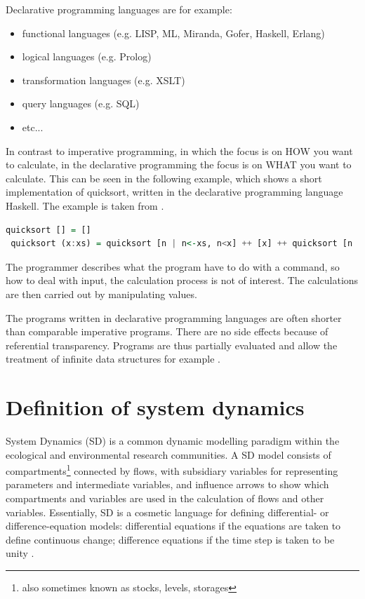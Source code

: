\par
Declarative programming languages are for example:
\begin{itemize}
	\item functional languages (e.g. LISP, ML, Miranda, Gofer, Haskell, Erlang)
	\item logical languages (e.g. Prolog)
	\item transformation languages (e.g. XSLT)
	\item query languages (e.g. SQL)
	\item etc...
\end{itemize}

\par
In contrast to imperative programming, in which the focus is on HOW you want to calculate, in the declarative programming the focus is on WHAT you want to calculate. This can be seen in the following example, which shows a short implementation of quicksort, written in the declarative programming language Haskell. The example is taken from \autocite{appendix:declarative_programming}.
\begin{lstlisting}[language=Haskell]
 quicksort [] = []
 quicksort (x:xs) = quicksort [n | n<-xs, n<x] ++ [x] ++ quicksort [n | n<-xs, n>=x]
\end{lstlisting}
The programmer describes what the program have to do with a command, so how to deal with input, the calculation process is not of interest. The calculations are then carried out by manipulating values.
\par
The programs written in declarative programming languages are often shorter than comparable imperative programs. There are no side effects because of referential transparency. Programs are thus partially evaluated and allow the treatment of infinite data structures for example \autocite{appendix:hawkins}.

\section{Definition of system dynamics}
\par
System Dynamics (SD) is a common dynamic modelling paradigm within the ecological and environmental research communities. A SD model consists of compartments\footnote{also sometimes known as stocks, levels, storages}  connected by flows, with subsidiary variables for representing parameters and intermediate variables, and influence arrows to show which compartments and variables are used in the calculation of flows and other variables. Essentially, SD is a cosmetic language for defining differential- or difference-equation models: differential equations if the equations are taken to define continuous change; difference equations if the time step is taken to be unity \autocite{appendix:model_paradigm}.

